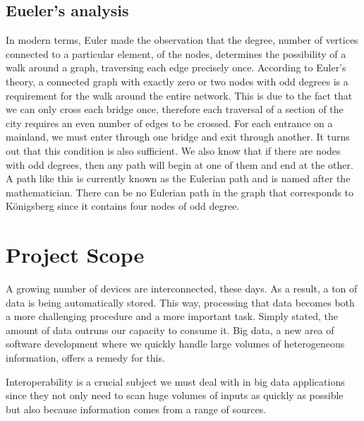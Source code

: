 \subsection{Eueler's analysis}

In modern terms, Euler made the observation that the degree, number of vertices connected to a particular element, of the nodes, determines the possibility of a walk around a graph, traversing each edge precisely once. According to Euler's theory, a connected graph with exactly zero or two nodes with odd degrees is a requirement for the walk around the entire network. This is due to the fact that we can only cross each bridge once, therefore each traversal of a section of the city requires an even number of edges to be crossed. For each entrance on a mainland, we must enter through one bridge and exit through another. It turns out that this condition is also sufficient. We also know that if there are nodes with odd degrees, then any path will begin at one of them and end at the other. A path like this is currently known as the Eulerian path and is named after the mathematician. There can be no Eulerian path in the graph that corresponds to Königsberg since it contains four nodes of odd degree.

\section{Project Scope}

A growing number of devices are interconnected, these days. As a result, a ton of data is being automatically stored. This way, processing that data becomes both a more challenging procedure and a more important task. Simply stated, the amount of data outruns our capacity to consume it. Big data, a new area of software development where we quickly handle large volumes of heterogeneous information, offers a remedy for this.

Interoperability is a crucial subject we must deal with in big data applications since they not only need to scan huge volumes of inputs as quickly as possible but also because information comes from a range of sources.

